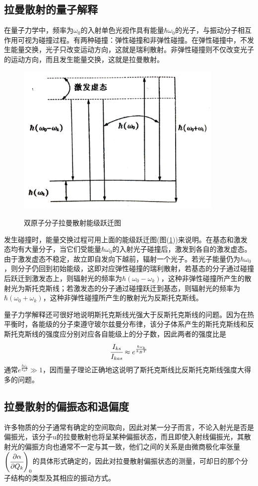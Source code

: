 \documentclass[a4paper]{article}
\begin{document}
\subsection{拉曼散射的量子解释}
在量子力学中，频率为$\omega_0$的入射单色光视作具有能量$\hbar\omega_0$的光子，与振动分子相互作用可视为碰撞过程。有两种碰撞：弹性碰撞和非弹性碰撞。在弹性碰撞中，不发生能量交换，光子只改变运动方向，这就是瑞利散射。非弹性碰撞则不仅改变光子的运动方向，而且发生能量交换，这就是拉曼散射。
\begin{figure}[!h]
\centering
\includegraphics[width=10cm]{fig/1.png}\\
\caption{双原子分子拉曼散射能级跃迁图}\label{fig1}
\end{figure}
发生碰撞时，能量交换过程可用上面的能级跃迁图(图(\ref{fig1}))来说明。在基态和激发态均有大量分子，当它们受能量$\hbar\omega_0$的入射光子碰撞后，激发到各自的激发虚态。由于激发虚态不稳定，故立即自发向下越前，辐射一个光子。若光子能量仍为$\hbar\omega_0$，则分子仍回到初始能级，这即对应弹性碰撞的瑞利散射，若基态的分子通过碰撞后跃迁到激发态上，则辐射光的频率为$\hbar(\omega_0 - \omega_k)$，这种非弹性碰撞所产生的散射光为斯托克斯线；若激发态的分子通过碰撞跃迁到基态，则辐射光的频率为$\hbar(\omega_0+\omega_k)$，这种非弹性碰撞所产生的散射光为反斯托克斯线。

量子力学解释还可很好地说明斯托克斯线光强大于反斯托克斯线的问题。因为在热平衡时，各能级的分子束遵守玻尔兹曼分布律，该分子体系产生的斯托克斯线和反斯托克斯线的强度应分别对应各自能级上的分子数，因此两者的强度比是
\begin{equation}
\cfrac{I_{ks}}{I_{kas}} \approx e^{\frac{\hbar\omega_k}{k_BT}}\label{eq7}
\end{equation}
通常$e^{\frac{\hbar\omega_k}{k_BT}}\gg 1$，因而量子理论正确地这说明了斯托克斯线比反斯托克斯线强度大得多的问题。
\subsection{拉曼散射的偏振态和退偏度}
许多物质的分子通常有确定的空间取向，因此对某一分子而言，不论入射光是否是偏振光，该分子u的拉曼散射也将呈某种偏振状态，而且即使入射线偏振光，其散射光的偏振方向也通常不一定与其一致，他们之间的关系是由微商极化率张量$\left(\cfrac{\partial\alpha}{\partial Q_k}\right)_0$的具体形式确定的，因此对拉曼散射偏振状态的测量，可却日的那个分子结构的类型及其相应的振动方式。
\end{document}
